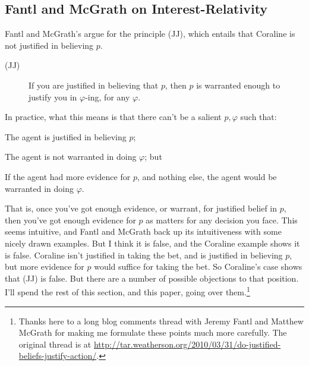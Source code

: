 \documentclass[11pt,oneside]{book}
\newcommand{\objrep}[2]{
\bigskip
\noindent \textit{Objection}: #1

\medskip
\noindent \textit{Reply}: #2

}
\newcommand{\argconc}{
\renewcommand{\labelenumi}{\Alph{enumi}.}
\setcounter{enumi}{2}
}
\begin{document}
\subsection{Fantl and McGrath on Interest-Relativity}

Fantl and McGrath's argue for the principle (JJ), which entails that Coraline is not justified in believing $p$.

\begin{description}
\item[(JJ)] If you are justified in believing that $p$, then $p$ is warranted enough to justify you in $\varphi$-ing, for any $\varphi$. \cite[99]{FantlMcGrath2009}
\end{description}

\noindent In practice, what this means is that there can't be a salient $p, \varphi$ such that:

\begin{itemize*}
\item The agent is justified in believing $p$;
\item The agent is not warranted in doing $\varphi$; but
\item If the agent had more evidence for $p$, and nothing else, the agent would be warranted in doing $\varphi$.
\end{itemize*}

\noindent That is, once you've got enough evidence, or warrant, for justified belief in $p$, then you've got enough evidence for $p$ as matters for any decision you face. This seems intuitive, and Fantl and McGrath back up its intuitiveness with some nicely drawn examples. But I think it is false, and the Coraline example shows it is false. Coraline isn't justified in taking the bet, and is justified in believing $p$, but more evidence for $p$ would suffice for taking the bet. So Coraline's case shows that (JJ) is false. But there are a number of possible objections to that position. I'll spend the rest of this section, and this paper, going over them.\footnote{Thanks here to a long blog comments thread with Jeremy Fantl and Matthew McGrath for making me formulate these points much more carefully. The original thread is at \url{http://tar.weatherson.org/2010/03/31/do-justified-beliefs-justify-action/}.}

\end{document}
